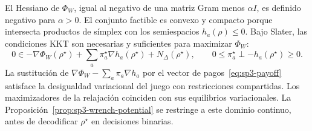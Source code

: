 El Hessiano de $\Phi_W$, igual al negativo de una matriz Gram menos $\alpha I$, es definido negativo para $\alpha>0$. El conjunto factible es convexo y compacto porque intersecta productos de símplex con los semiespacios $h_a(\rho)\leq0$. Bajo Slater, las condiciones KKT son necesarias y suficientes para maximizar $\Phi_W$:
\[
  0\in-\nabla\Phi_W(\rho^\star)
  +\sum_a\pi_a^\star\nabla h_a(\rho^\star)
  +N_{\Delta}(\rho^\star),
  \qquad
  0\leq\pi_a^\star\perp-h_a(\rho^\star)\geq0.
\]
La sustitución de $\nabla\Phi_W-\sum_a\pi_a\nabla h_a$ por el vector de pagos~\eqref{eq:sp3-payoff} satisface la desigualdad variacional del juego con restricciones compartidas. Los maximizadores de la relajación coinciden con sus equilibrios variacionales. La Proposición~\ref{prop:sp3-wrench-potential} se restringe a este dominio continuo, antes de decodificar \(\rho^\star\) en decisiones binarias.
